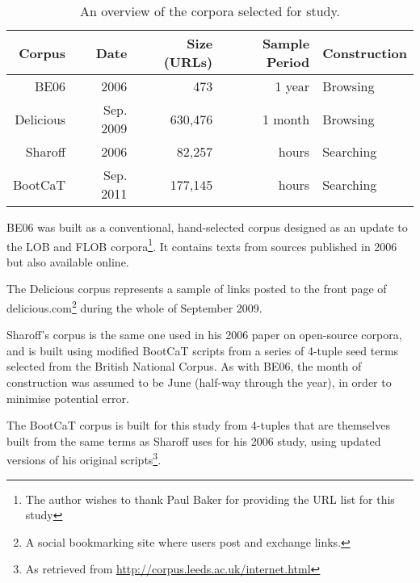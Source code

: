 \begin{table*}[ht!]
    \centering
    \begin{tabular}{|r|r|r|r|l|}
    \hline
    Corpus    & Date	    & Size (URLs)   & Sample Period	& Construction \\ 
    \hline
    BE06      & 2006	    & 473	    & 1 year		&  Browsing \\ 
    Delicious & Sep. 2009   & 630,476	    & 1 month		&  Browsing \\
    Sharoff   & 2006        & 82,257	    & hours		&  Searching \\
    BootCaT  & Sep. 2011    & 177,145	    & hours		&  Searching \\ 
    \hline
    \end{tabular}

    
    \caption{An overview of the corpora selected for study.}
    \label{table:datmeth:datasum}
\end{table*}

BE06\cite{baker2009be06} 
was built as a conventional, hand-selected corpus designed as an update to the LOB\cite{johansson1980lob} and FLOB\cite{hundt1998manual} corpora\footnote{The author wishes to thank Paul Baker for providing the URL list for this study}.  It contains texts from sources published in 2006 but also available online.

The Delicious corpus represents a sample of links posted to the front page of delicious.com\footnote{A social bookmarking site where users post and exchange links.} during the whole of September 2009.  

Sharoff's corpus is the same one used in his 2006 paper on open-source corpora, and is built using modified BootCaT scripts from a series of 4-tuple seed terms selected from the British National Corpus.  As with BE06, the month of construction was assumed to be June (half-way through the year), in order to minimise potential error.

The BootCaT corpus is built for this study from 4-tuples that are themselves built from the same terms as Sharoff uses for his 2006 study, using updated versions of his original scripts\footnote{As retrieved from \url{http://corpus.leeds.ac.uk/internet.html}}.




